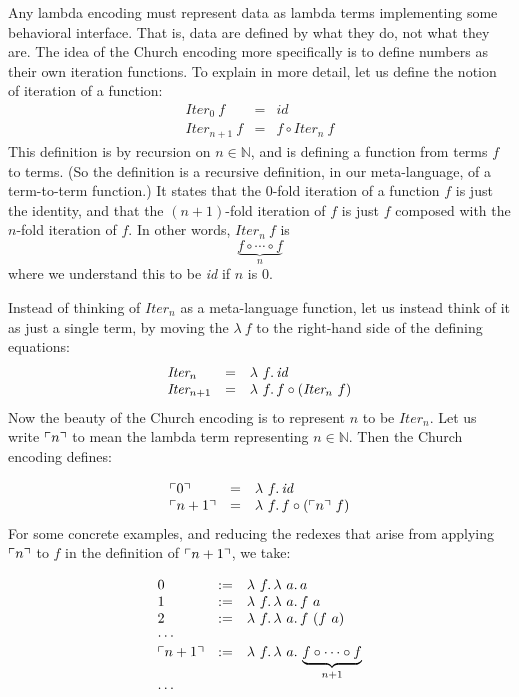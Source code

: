 Any lambda encoding must represent data as lambda terms implementing
some behavioral interface.  That is, data are defined by what they do,
not what they are.  The idea of the Church encoding more specifically
is to define numbers as their own iteration functions.  To explain
in more detail, let us define the notion of iteration of a function:
\[
\begin{array}{lll}
  \textit{Iter}_0\ f & = & \textit{id} \\ 
  \textit{Iter}_{n+1}\ f & = & f \circ \textit{Iter}_n\ f
\end{array}
\]
\noindent This definition is by recursion on $n\in\mathbb{N}$, and is
defining a function from terms $f$ to terms.  (So the definition is a
recursive definition, in our meta-language, of a term-to-term
function.)  It states that the $0$-fold iteration of a function $f$ is
just the identity, and that the $(n+1)$-fold iteration of $f$ is just
$f$ composed with the $n$-fold iteration of $f$.  In other words,
$\textit{Iter}_n\ f$ is
\[
\underbrace{f \circ \cdots \circ f}_{n}
\]
\noindent where we understand this to be \textit{id} if $n$ is $0$.

Instead of thinking of $\textit{Iter}_n$ as a meta-language function,
let us instead think of it as just a single term, by moving the $\lambda\ f$ to
the right-hand side of the defining equations:
\[
\begin{array}{lll}
  \textit{Iter}_n & = & \lam{f}{\textit{id}} \\ 
  \textit{Iter}_{n+1} & = & \lam{f}{f \circ (\textit{Iter}_n\ f)}
\end{array}
\]
\noindent Now the beauty of the Church encoding is to represent $n$
to be $\textit{Iter}_n$.  Let us write $\ulcorner n \urcorner$ to mean the lambda
term representing $n\in\mathbb{N}$.  Then the Church encoding defines:

\[
\begin{array}{lll}
  \ulcorner 0 \urcorner & = & \lambda\ f.\, \textit{id} \\ 
  \ulcorner n+1 \urcorner & = & \lambda\ f.\, f \circ (\ulcorner n \urcorner\ f)
\end{array}
\]
\noindent For some concrete examples, and reducing the redexes that arise from applying $\ulcorner n \urcorner$ to $f$ in the
definition of $\ulcorner n+1 \urcorner$, we take:

\[
\begin{array}{lll}
  0 & := & \lam{f}{\lam{a}{a}} \\
  1 & := & \lam{f}{\lam{a}{f\ a}} \\
  2 & := & \lam{f}{\lam{a}{f\ (f\ a)}} \\
  \multicolumn{3}{l}{\cdots} \\
  \rep{n+1} & := & \lam{f}{\lam{a}{\underbrace{f \circ \cdots \circ f}_{n+1}}} \\
  \multicolumn{3}{l}{\cdots}
\end{array}
\]

